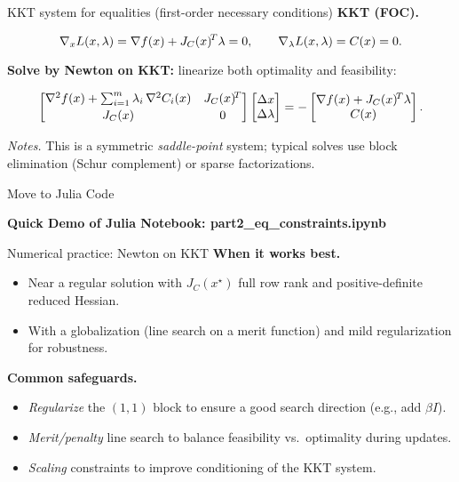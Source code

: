 \begin{frame}{KKT system for equalities (first-order necessary conditions)}
\textbf{KKT (FOC).}

$$
\nabla_x L(x,\lambda)=\nabla f(x)+J_C(x)^{\!T}\lambda=0,\qquad \nabla_\lambda L(x,\lambda)=C(x)=0.
$$

\textbf{Solve by Newton on KKT:} linearize both optimality and feasibility:

$$
\begin{bmatrix}
\nabla^2 f(x) + \sum_{i=1}^m \lambda_i\,\nabla^2 C_i(x) & J_C(x)^{\!T}\\[2pt]
J_C(x) & 0
\end{bmatrix}
\begin{bmatrix}\Delta x\\ \Delta\lambda\end{bmatrix}
=-
\begin{bmatrix}
\nabla f(x)+J_C(x)^{\!T}\lambda\\ C(x)
\end{bmatrix}.
$$

\textit{Notes.} This is a symmetric \emph{saddle-point} system; typical solves use block elimination (Schur complement) or sparse factorizations.


\end{frame}

\begin{frame}{Move to Julia Code}
\begin{center}
    \textbf{Quick Demo of Julia Notebook: part2\_eq\_constraints.ipynb}
\end{center}
\end{frame}

\begin{frame}{Numerical practice: Newton on KKT}
\textbf{When it works best.}
\begin{itemize}
\item Near a regular solution with $J_{C}(x^\star)$ full row rank  and positive-definite reduced Hessian.
\item With a globalization (line search on a merit function) and mild regularization for robustness.
\end{itemize}

\textbf{Common safeguards.}
\begin{itemize}
\item \emph{Regularize} the $(1,1)$ block to ensure a good search direction (e.g., add $\beta I$).
\item \emph{Merit/penalty} line search to balance feasibility vs.\ optimality during updates.
\item \emph{Scaling} constraints to improve conditioning of the KKT system.
\end{itemize}


\end{frame}

